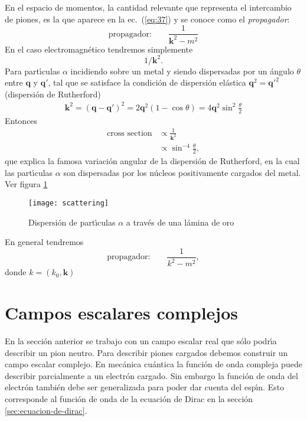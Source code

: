 En el espacio de momentos, la cantidad relevante que representa el
intercambio de piones, es la que aparece en la ec.~(\ref{eq:37}) y se
conoce como el \emph{propagador}:
\begin{equation}
\text{propagador:}\qquad \frac{1}{\mathbf{k}^2-m^2}
\end{equation}
En el caso electromagn\'etico tendremos simplemente
\begin{equation}
  1/\mathbf{k}^2.
\end{equation}
Para part\'\i culas $\alpha$ incidiendo sobre un metal y siendo dispersadas por un \'angulo $\theta$ entre $\mathbf{q}$ y $\mathbf{q}'$, tal que se satisface la condici\'on de dispersi\'on el\'astica $\mathbf{q}^2={\mathbf{q}'}^2$ (dispersi\'on de Rutherford)
\begin{align}
  \mathbf{k}^2=(\mathbf{q}-\mathbf{q}')^2=2\mathbf{q}^2(1-\cos\theta)=4\mathbf{q}^2\sin^2\frac{\theta}{2}
\end{align}
Entonces
\begin{align}
  \text{cross section}&\propto\frac{1}{\mathbf{k}^2}\nonumber\\
  &\propto\sin^{-4}\frac{\theta}{2},
\end{align}
que explica la famosa variaci\'on angular de la dispersi\'on de Rutherford, en la cual las part\'\i culas $\alpha$ son dispersadas por los n\'ucleos positivamente cargados del metal. Ver figura \ref{fig:sr}

\begin{figure} %
\texttt{[image: scattering]} %
  \caption{Dispersi\'on de part\'\i culas $\alpha$ a trav\'es de una l\'amina de oro} %
  \label{fig:sr} %
\end{figure} %

 
En general tendremos
\begin{equation}
\text{propagador:}\qquad \frac{1}{k^2-m^2},
\end{equation}
donde $k=(k_0,\mathbf{k})$




\section{Campos escalares complejos}
\label{sec:camp-escal-compl}
En la secci\'on anterior se trabajo con un campo escalar real que s\'olo podr\'\i a describir un pion neutro. Para describir piones cargados debemos construir un campo escalar complejo. En mec\'anica cu\'antica la funci\'on de onda compleja puede describir parcialmente a un electr\'on cargado. Sin embargo la funci\'on de onda del electr\'on tambi\'en debe ser generalizada para poder dar cuenta del esp\'\i n. Esto corresponde al funci\'on de onda de la ecuaci\'on de Dirac en la secci\'on \ref{sec:ecuacion-de-dirac}.

